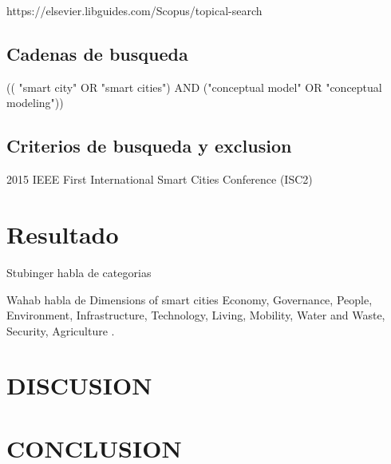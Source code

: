 \documentclass[a4paper,fleqn,spanish]{cas-dc}
\begin{document}
https://elsevier.libguides.com/Scopus/topical-search



\subsection{Cadenas de busqueda}\label{cadena}

(( "smart city" OR "smart cities") AND ("conceptual model" OR "conceptual modeling"))


\subsection{Criterios de busqueda y exclusion}\label{seleccion}

2015 IEEE First International Smart Cities Conference (ISC2)


\section{Resultado}\label{resultados}

Stubinger habla de categorias
\cite{stubinger_understanding_2020}

Wahab habla de Dimensions of smart cities \cite{wahab_systematic_2020}
Economy,
Governance,
People,
Environment,
Infrastructure,
Technology,
Living,
Mobility,
Water and Waste,
Security, 
Agriculture
.


\section{DISCUSION}\label{discusion}



\section{CONCLUSION}\label{conclucion}





%
%

%



%
\end{document}
